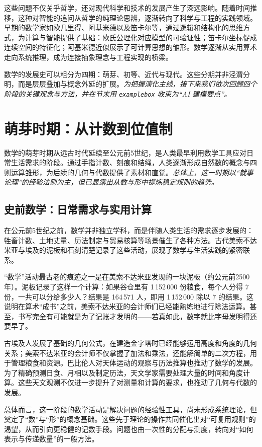 这些问题不仅关乎哲学，还对现代科学和技术的发展产生了深远影响。随着时间推移，这种对智能的追问从哲学的纯理论思辨，逐渐转向了科学与工程的实践领域。早期的数学家如欧几里得、阿基米德以及笛卡尔等，通过逻辑和结构化的思维方式，为计算与智能提供了基础：欧氏公理化对应模型的可验证性；笛卡尔坐标促成连续空间的特征化；阿基米德近似展示了可计算思想的雏形。数学逐渐从实用算术走向系统推理，成为连接抽象理念与工程实现的桥梁。

数学的发展史可以粗分为四期：萌芽、初等、近代与现代。这些分期并非泾渭分明，而是层层叠加与概念外延的扩展。\emph{为把握演化主线，接下来我们依次回顾四个阶段的关键观念与方法，并在节末用 \texttt{examplebox} 收束为“AI 建模要点”。}

\section{萌芽时期：从计数到位值制}

数学的萌芽时期从远古时代延续至公元前5世纪，是人类最早利用数学工具应对日常生活需求的阶段。通过手指计数、刻痕和结绳，人类逐渐形成自然数的概念与四则运算雏形，为后续的几何与代数提供了素材和直觉。\emph{总体上，这一时期以“就事论理”的经验法则为主，但已显露出从数与形中提炼稳定规则的趋势。}

\subsection{史前数学：日常需求与实用计算}

在公元前5世纪之前，数学并非独立学科，而是伴随人类生活的需求逐步发展的：牲畜计数、土地丈量、历法制定与贸易核算等场景催生了各种方法。古代美索不达米亚与埃及的泥板和石刻清楚记录了这些活动，展现了数学与生活实践的紧密联系。

“数学”活动最古老的痕迹之一是在美索不达米亚发现的一块泥板（约公元前2500年）。泥板记录了这样一个计算：如果谷仓里有 1\,152\,000 份粮食，每个人分得 7 份，一共可以分给多少人？结果是 164\,571 人，即用 1\,152\,000 除以 7 的结果。这说明在算术“成书”之前，美索不达米亚的会计师们已经能熟练地进行除法运算。甚至，书写完全有可能就是为了记账才发明的——若真如此，数字就比字母发明得还要早了。

古埃及人发展了基础的几何公式，在建造金字塔时已经能够运用高度和角度的几何关系；美索不达米亚的会计师不仅掌握了加法和乘法，还能解简单的二次方程，用于管理粮食和资源。巴比伦人对天体运动的观察与历法推算也推动了数学的发展。为了精确预测日食、月相以及制定历法，天文学家需要处理大量的时间和角度计算。这些天文观测不仅进一步提升了对测量和计算的要求，也推动了几何与代数的发展。

总体而言，这一阶段的数学活动是解决问题的经验性工具，尚未形成系统理论，但奠定了“数”与“形”的概念基础。这些先于理论的操作共同催化出对“可复用规则”的渴望，从而引向更稳健的记数手段。问题也由一次性的分配与测度，转向对“如何表示与传递数量”的一般方法。

